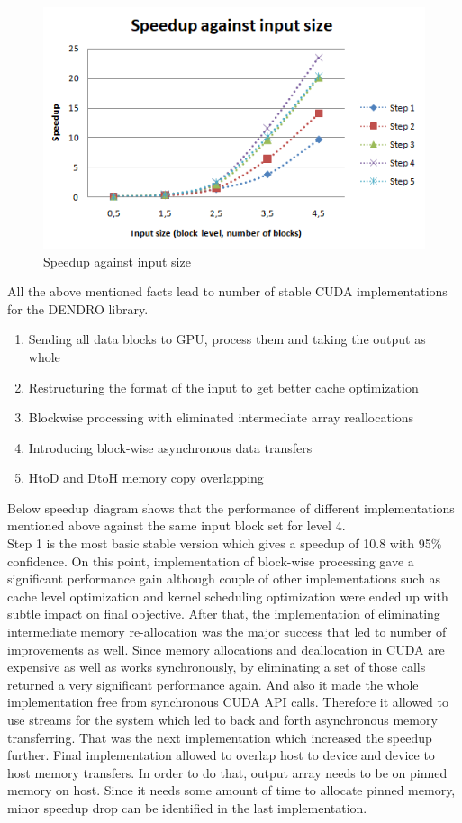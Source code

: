 \begin{figure}
  \includegraphics[width=\linewidth]{./images/graph.png}
  \caption{Speedup against input size}
  \label{fig:graph}
\end{figure}
All the above mentioned facts lead to number of stable CUDA implementations for the DENDRO library.
\begin{enumerate}
\item Sending all data blocks to GPU, process them and taking the output as whole
\item Restructuring the format of the input to get better cache optimization
\item Blockwise processing with eliminated intermediate array reallocations
\item Introducing block-wise asynchronous data transfers
\item HtoD and DtoH memory copy overlapping
\end{enumerate}
Below speedup diagram shows that the performance of different implementations mentioned above against the same input block set for level 4.
\\Step 1 is the most basic stable version which gives a speedup of 10.8 with 95\% confidence. On this point, implementation of block-wise processing gave a significant performance gain although couple of other implementations such as cache level optimization and kernel scheduling optimization were ended up with subtle impact on final objective. After that, the implementation of eliminating intermediate memory re-allocation was the major success that led to number of improvements as well. Since memory allocations and deallocation in CUDA are expensive as well as works synchronously, by eliminating a set of those calls returned a very significant performance again. And also it made the whole implementation free from synchronous CUDA API calls. Therefore it allowed to use streams for the system which led to back and forth asynchronous memory transferring. That was the next implementation which increased the speedup further. Final implementation allowed to overlap host to device and device to host memory transfers. In order to do that, output array needs to be on pinned memory on host. Since it needs some amount of time to allocate pinned memory, minor speedup drop can be identified in the last implementation.
